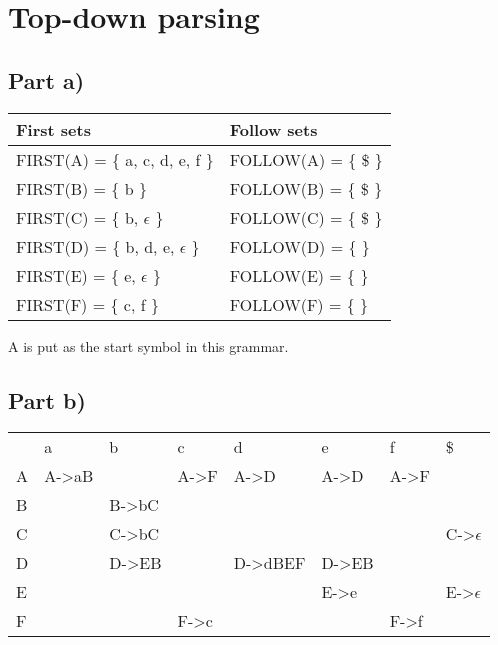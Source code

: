 \documentclass[paper=a4, fontsize=11pt]{scrartcl} %
\numberwithin{equation}{section} %
\numberwithin{figure}{section} %
\numberwithin{table}{section} %
\begin{document}
\section{Top-down parsing}
\subsection{Part a)}
\begin{center}
    \begin{tabular}{ | l | l | }
    \hline
    First sets                              & Follow sets \\
    \hline
    FIRST(A) = \{ a, c, d, e, f \}          & FOLLOW(A) = \{ \$ \} \\
    \hline
    FIRST(B) = \{ b \}                      & FOLLOW(B) = \{ \$ \} \\
    \hline
    FIRST(C) = \{ b, $\epsilon$ \}          & FOLLOW(C) = \{ \$ \} \\
    \hline
    FIRST(D) = \{ b, d, e, $\epsilon$ \}    & FOLLOW(D) = \{ \} \\
    \hline
    FIRST(E) = \{ e, $\epsilon$ \}          & FOLLOW(E) = \{ \} \\
    \hline
    FIRST(F) = \{ c, f \}                   & FOLLOW(F) = \{ \} \\
    \hline
    \end{tabular}
\end{center}
A is put as the start symbol in this grammar.
\subsection{Part b)}
\begin{center}
    \begin{tabular}{ | l || l | l | l | l | l | l | l | }
    \hline
        & a         & b         & c         & d         & e     & f     &   \$              \\
    \hhline{|=||=|=|=|=|=|=|=|}
    A   & A->aB     &           & A->F      & A->D      & A->D  & A->F  &                   \\
    \hline
    B   &           & B->bC     &           &           &       &       &                   \\
    \hline
    C   &           & C->bC     &           &           &       &       & C->$\epsilon$     \\
    \hline
    D   &           & D->EB     &           & D->dBEF   & D->EB &       &                   \\
    \hline
    E   &           &           &           &           & E->e  &       & E->$\epsilon$     \\
    \hline
    F   &           &           & F->c      &           &       & F->f  &                   \\
    \hline
    \end{tabular}
\end{center}
\end{document}
